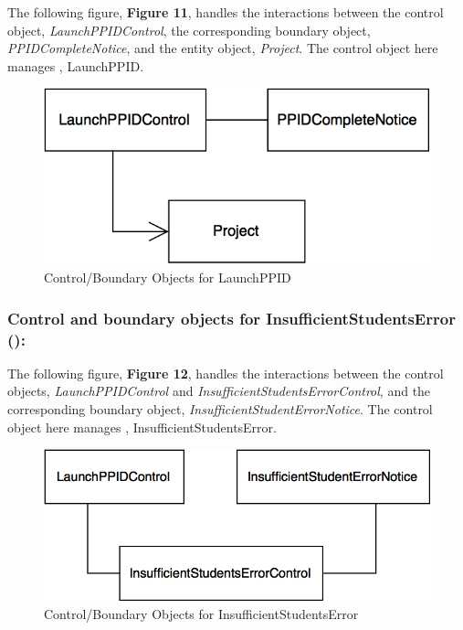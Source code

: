 \documentclass[12pt,letterpaper]{article}
\begin{document}
The following figure, {\bf Figure 11}, handles the interactions between the control object, {\it LaunchPPIDControl}, the corresponding
boundary object, {\it PPIDCompleteNotice}, and the entity object, {\it Project}. The control object here manages \launchppid{}, LaunchPPID.

\begin{figure}[H]
	\centering{}
	\includegraphics[scale=0.37]{imgs/cbod/launch-ppid.png}
	\caption{Control/Boundary Objects for LaunchPPID}
\end{figure}

\subsubsection*{Control and boundary objects for InsufficientStudentsError (\insufficientstudentserror{}):}

The following figure, {\bf Figure 12}, handles the interactions between the control objects, {\it LaunchPPIDControl} and {\it InsufficientStudentsErrorControl}, 
and the corresponding boundary object, {\it InsufficientStudentErrorNotice}. The control object here manages \insufficientstudentserror{}, InsufficientStudentsError.

\begin{figure}[H]
	\centering{}
	\includegraphics[scale=0.37]{imgs/cbod/insufficient-students-error.png}
	\caption{Control/Boundary Objects for InsufficientStudentsError}
\end{figure}
\end{document}

